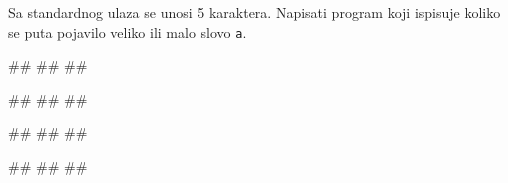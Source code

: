 \begin{Exercise}[label=p1.6_] 
Sa standardnog ulaza se unosi 5 karaktera. Napisati program koji ispisuje koliko
se puta pojavilo veliko ili malo slovo \verb|a|. \\
\begin{miditest}
\begin{upotreba}{1}
#\naslovInt#
##
##
\end{upotreba}
\end{miditest}
\begin{miditest}
\begin{upotreba}{2}
#\naslovInt#
##
##
\end{upotreba}
\end{miditest}

\begin{miditest}
\begin{upotreba}{3}
#\naslovInt#
##
##
\end{upotreba}
\end{miditest}
\begin{miditest}
\begin{upotreba}{4}
#\naslovInt#
##
##
\end{upotreba}
\end{miditest}
\end{Exercise}
\begin{Answer}[ref=p1.6_]
\end{Answer}


